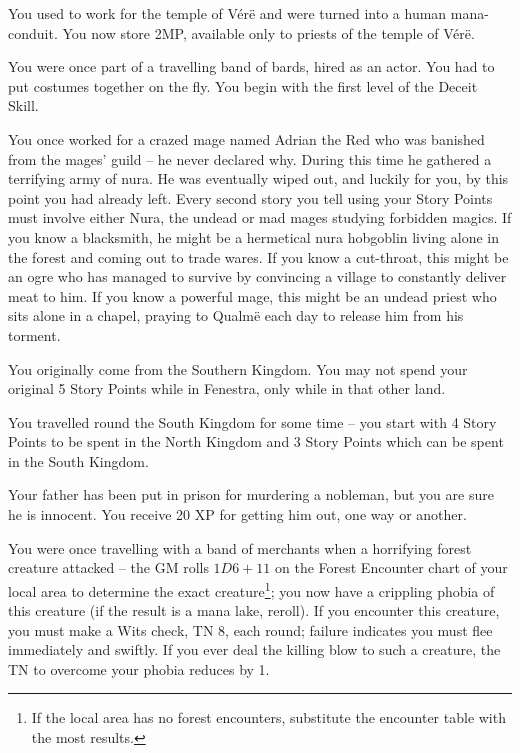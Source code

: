 \begin{multicols}{2}
\begin{list}{\addtocounter{list}{1}\textbf{:}}{\raggedleft}
\item{You used to work for the temple of V\'{e}r\"{e} and were turned into a human mana-conduit.  You now store 2MP, available only to priests of the temple of V\'{e}r\"{e}.}

\item{You were once part of a travelling band of bards, hired as an actor.  You had to put costumes together on the fly.  You begin with the first level of the Deceit Skill.}

\item{You once worked for a crazed mage named Adrian the Red who was banished from the mages' guild -- he never declared why.  During this time he gathered a terrifying army of nura.  He was eventually wiped out, and luckily for you, by this point you had already left.  Every second story you tell using your Story Points must involve either Nura, the undead or mad mages studying forbidden magics.  If you know a blacksmith, he might be a hermetical nura hobgoblin living alone in the forest and coming out to trade wares.  If you know a cut-throat, this might be an ogre who has managed to survive by convincing a village to constantly deliver meat to him.  If you know a powerful mage, this might be an undead priest who sits alone in a chapel, praying to Qualm\"{e} each day to release him from his torment.}

\item{You originally come from the Southern Kingdom.  You may not spend your original 5 Story Points while in Fenestra, only while in that other land.}

\item{You travelled round the South Kingdom for some time -- you start with 4 Story Points to be spent in the North Kingdom and 3 Story Points which can be spent in the South Kingdom.}

\item{Your father has been put in prison for murdering a nobleman, but you are sure he is innocent.  You receive 20 XP for getting him out, one way or another.}

\item{You were once travelling with a band of merchants when a horrifying forest creature attacked -- the GM rolls $1D6+11$ on the Forest Encounter chart of your local area to determine the exact creature\footnote{If the local area has no forest encounters, substitute the encounter table with the most results.}; you now have a crippling phobia of this creature (if the result is a mana lake, reroll).  If you encounter this creature, you must make a Wits check, TN 8, each round; failure indicates you must flee immediately and swiftly.  If you ever deal the killing blow to such a creature, the TN to overcome your phobia reduces by 1.}


\end{list}
\end{multicols}
